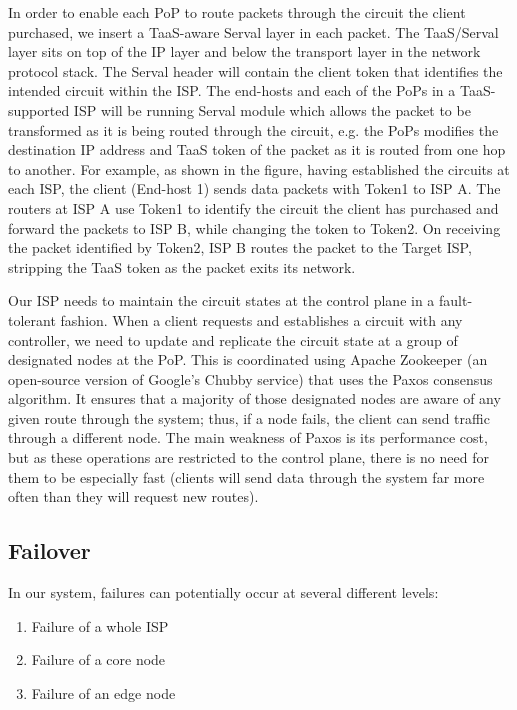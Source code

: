 \documentclass{article}
\begin{document}
In order to enable each PoP to route packets through the circuit the
client purchased, we insert a TaaS-aware Serval layer in each
packet. The TaaS/Serval layer sits on top of the IP layer and below
the transport layer in the network protocol stack. The Serval header
will contain the client token that identifies the intended circuit
within the ISP. The end-hosts and each of the PoPs in a TaaS-supported
ISP will be running Serval module which allows the packet to be
transformed as it is being routed through the circuit, e.g. the PoPs
modifies the destination IP address and TaaS token of the packet as it
is routed from one hop to another. For example, as shown in the
figure, having established the circuits at each ISP, the client
(End-host 1) sends data packets with Token1 to ISP A. The routers at
ISP A use Token1 to identify the circuit the client has purchased and
forward the packets to ISP B, while changing the token to Token2. On
receiving the packet identified by Token2, ISP B routes the packet to
the Target ISP, stripping the TaaS token as the packet exits its
network.

Our ISP needs to maintain the circuit states at the control plane in a
fault-tolerant fashion. When a client requests and establishes a
circuit with any controller, we need to update and replicate the
circuit state at a group of designated nodes at the PoP. This is
coordinated using Apache Zookeeper (an open-source version of Google's
Chubby service) that uses the Paxos consensus algorithm. It ensures
that a majority of those designated nodes are aware of any given route
through the system; thus, if a node fails, the client can send traffic
through a different node. The main weakness of Paxos is its
performance cost, but as these operations are restricted to the
control plane, there is no need for them to be especially fast
(clients will send data through the system far more often than they
will request new routes).

\subsection{Failover}

In our system, failures can potentially occur at several different
levels:

\begin{enumerate}
\item Failure of a whole ISP
\item Failure of a core node
\item Failure of an edge node
\end{enumerate}
\end{document}
